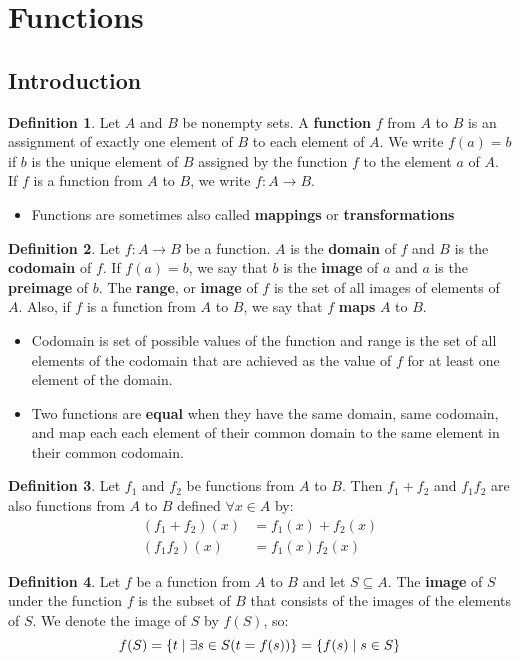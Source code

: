\documentclass[article, 12pt]{article}
\theoremstyle{definition}
\newtheorem{definition}{Definition}[subsection]
\DeclarePairedDelimiter\set{\{}{\}}
\begin{document}
    \section{Functions}
    \subsection{Introduction}
    \begin{definition}
        Let $A$ and $B$ be nonempty sets. A \textbf{function} $f$ from $A$ to $B$ is an assignment of exactly one element of $B$ to each element of $A$. We write $f(a) = b$ if $b$ is the unique element of $B$ assigned by the function $f$ to the element $a$ of $A$. If $f$ is a function from $A$ to $B$, we write $f: A \to B$.
        \begin{itemize}
            \item Functions are sometimes also called \textbf{mappings} or \textbf{transformations}
        \end{itemize}
    \end{definition}
    \begin{definition}
        Let $f: A \to B$ be a function. $A$ is the \textbf{domain} of $f$ and $B$ is the \textbf{codomain} of $f$. If $f(a) = b$, we say that $b$ is the \textbf{image} of $a$ and $a$ is the \textbf{preimage} of $b$. The \textbf{range}, or \textbf{image} of $f$ is the set of all images of elements of $A$. Also, if $f$ is a function from $A$ to $B$, we say that $f$ \textbf{maps} $A$ to $B$.
        \begin{itemize}
            \item Codomain is set of possible values of the function and range is the set of all elements of the codomain that are achieved as the value of $f$ for at least one element of the domain.
            \item Two functions are \textbf{equal} when they have the same domain, same codomain, and map each each element of their common domain to the same element in their common codomain.
        \end{itemize}
    \end{definition}
    \begin{definition}
        Let $f_1$ and $f_2$ be functions from $A$ to $B$. Then $f_1 + f_2$ and $f_1f_2$ are also functions from $A$ to $B$ defined $\forall x \in A$ by:
        \begin{align*}
            (f_1 + f_2)(x) &= f_1(x) + f_2(x) \\
               (f_1f_2)(x) &= f_1(x)f_2(x)
        \end{align*}
    \end{definition}
    \begin{definition}
        Let $f$ be a function from $A$ to $B$ and let $S \subseteq A$. The \textbf{image} of $S$ under the function $f$ is the subset of $B$ that consists of the images of the elements of $S$. We denote the image of $S$ by $f(S)$, so:
        \begin{equation*}
            f(S) = \set*{t \mid \exists s \in S (t = f(s))} = \set*{f(s) \mid s \in S}
        \end{equation*}
    \end{definition}
\end{document}
